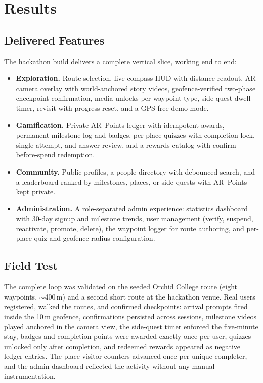 \chapter{Results}
\label{ch:results}

\section{Delivered Features}
The hackathon build delivers a complete vertical slice, working end to end:

\begin{itemize}
  \item \textbf{Exploration.} Route selection, live compass HUD with
        distance readout, AR camera overlay with world-anchored story
        videos, geofence-verified two-phase checkpoint confirmation, media
        unlocks per waypoint type, side-quest dwell timer, revisit with
        progress reset, and a GPS-free demo mode.
  \item \textbf{Gamification.} Private AR~Points ledger with idempotent
        awards, permanent milestone log and badges, per-place quizzes with
        completion lock, single attempt, and answer review, and a rewards
        catalog with confirm-before-spend redemption.
  \item \textbf{Community.} Public profiles, a people directory with
        debounced search, and a leaderboard ranked by milestones, places,
        or side quests with AR~Points kept private.
  \item \textbf{Administration.} A role-separated admin experience:
        statistics dashboard with 30-day signup and milestone trends, user
        management (verify, suspend, reactivate, promote, delete), the
        waypoint logger for route authoring, and per-place quiz and
        geofence-radius configuration.
\end{itemize}

\section{Field Test}
The complete loop was validated on the seeded Orchid College route
(eight waypoints, $\sim$400\,m) and a second short route at the hackathon
venue. Real users registered, walked the routes, and confirmed checkpoints:
arrival prompts fired inside the 10\,m geofence, confirmations persisted
across sessions, milestone videos played anchored in the camera view, the
side-quest timer enforced the five-minute stay, badges and completion
points were awarded exactly once per user, quizzes unlocked only after
completion, and redeemed rewards appeared as negative ledger entries. The
place visitor counters advanced once per unique completer, and the admin
dashboard reflected the activity without any manual instrumentation.

